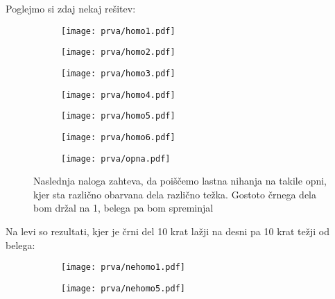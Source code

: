 \documentclass{article}
\begin{document}
Poglejmo si zdaj nekaj rešitev:

\begin{figure}[H]
\centering
\begin{subfigure}{.49\textwidth}
\texttt{[image: prva/homo1.pdf]}
\end{subfigure}
\begin{subfigure}{.49\textwidth}
\texttt{[image: prva/homo2.pdf]}
\end{subfigure}
\end{figure}

\begin{figure}[H]
\centering
\begin{subfigure}{.49\textwidth}
\texttt{[image: prva/homo3.pdf]}
\end{subfigure}
\begin{subfigure}{.49\textwidth}
\texttt{[image: prva/homo4.pdf]}
\end{subfigure}
\end{figure}

\begin{figure}[H]
\centering
\begin{subfigure}{.49\textwidth}
\texttt{[image: prva/homo5.pdf]}
\end{subfigure}
\begin{subfigure}{.49\textwidth}
\texttt{[image: prva/homo6.pdf]}
\end{subfigure}
\end{figure}

\begin{figure}[H]
\centering
\begin{subfigure}{.7\textwidth}
\texttt{[image: prva/opna.pdf]}
\end{subfigure}
\caption*{Naslednja naloga zahteva, da poiščemo lastna nihanja na takile opni, kjer sta različno obarvana dela različno težka. Gostoto črnega dela bom držal na 1, belega pa bom spreminjal}
\end{figure}

Na levi so rezultati, kjer je črni del 10 krat lažji na desni pa 10 krat težji od belega:

\begin{figure}[H]
\centering
\begin{subfigure}{.49\textwidth}
\texttt{[image: prva/nehomo1.pdf]}
\end{subfigure}
\begin{subfigure}{.49\textwidth}
\texttt{[image: prva/nehomo5.pdf]}
\end{subfigure}
\end{figure}
\end{document}
